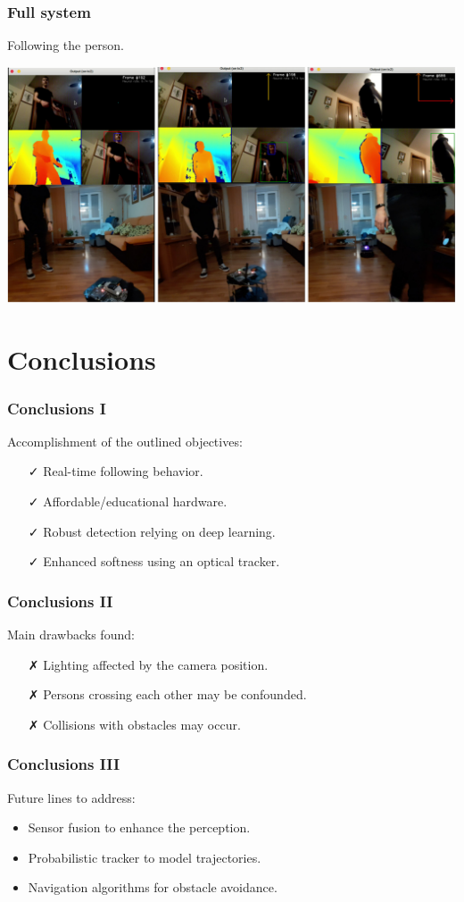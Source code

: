 \documentclass[11pt]{beamer}
\begin{document}
\begin{frame}
	\frametitle{Full system}
	Following the person.
	\begin{center}
		\href{https://www.youtube.com/watch?v=WZ0riKMwJWA}{\includegraphics[width=0.75\linewidth]{final_test}}
	\end{center}
\end{frame}

\section{Conclusions}
\begin{frame}
	\frametitle{Conclusions I}
	Accomplishment of the outlined objectives:
	\begin{itemize}
		\item [\faCheck] Real-time following behavior.
		\item [\faCheck] Affordable/educational hardware.\pause
		\item [\faCheck] Robust detection relying on deep learning.\pause
		\item [\faCheck] Enhanced softness using an optical tracker.
	\end{itemize}
\end{frame}
\begin{frame}
	\frametitle{Conclusions II}
	Main drawbacks found:
	\begin{itemize}
		\item [\faClose] Lighting affected by the camera position.\pause
		\item [\faClose] Persons crossing each other may be confounded.\pause
		\item [\faClose] Collisions with obstacles may occur.
	\end{itemize}
\end{frame}

\begin{frame}
	\frametitle{Conclusions III}
	Future lines to address:
	\begin{itemize}
		\item Sensor fusion to enhance the perception.\pause
		\item Probabilistic tracker to model trajectories.\pause
		\item Navigation algorithms for obstacle avoidance.
	\end{itemize}
\end{frame}

\begin{frame}
	\titlepage
\end{frame}

%
\end{document}
